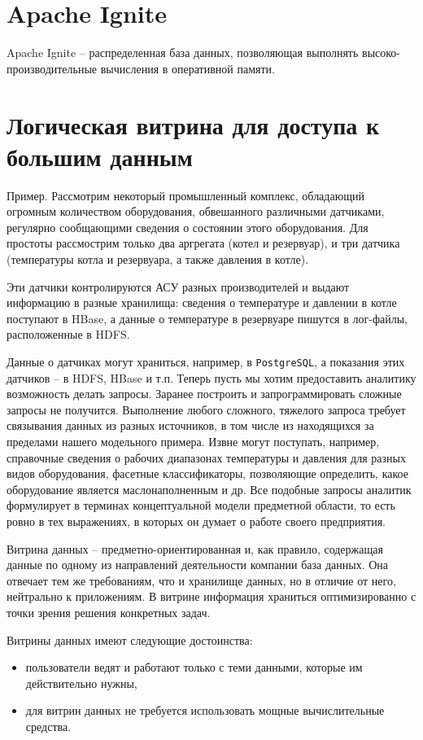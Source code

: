 \documentclass[%
	11pt,
	a4paper,
	utf8,
		]{article}
\begin{document}
\section{Apache Ignite}

Apache Ignite -- распределенная база данных, позволяющая выполнять высоко-производительные вычисления в оперативной памяти.


\section{Логическая витрина для доступа к большим данным}

Пример. Рассмотрим некоторый промышленный комплекс, обладающий огромным количеством оборудования, обвешанного различными датчиками, регулярно сообщающими сведения о состоянии этого оборудования. Для простоты рассмострим только два аргрегата (котел и резервуар), и три датчика (температуры котла и резервуара, а также давления в котле).

Эти датчики контролируются АСУ разных производителей и выдают информацию в разные хранилища: сведения о температуре и давлении в котле поступают в HBase, а данные о температуре в резервуаре пишутся в лог-файлы, расположенные в HDFS.

Данные о датчиках могут храниться, например, в \texttt{PostgreSQL}, а показания этих датчиков -- в HDFS, HBase и т.п. Теперь пусть мы хотим предоставить аналитику возможность делать запросы. Заранее построить и запрограммировать сложные запросы не получится. Выполнение любого сложного, тяжелого запроса требует связывания данных из разных источников, в том числе из находящихся за пределами нашего модельного примера. Извне могут поступать, например, справочные сведения о рабочих диапазонах температуры и давления для разных видов оборудования, фасетные классификаторы, позволяющие определить, какое оборудование является маслонаполненным и др. Все подобные запросы аналитик формулирует в терминах концептуальной модели предметной области, то есть ровно в тех выражениях, в которых он думает о работе своего предприятия.

Витрина данных -- предметно-ориентированная и, как правило, содержащая данные по одному из направлений деятельности компании база данных. Она отвечает тем же требованиям, что и хранилище данных, но в отличие от него, нейтрально к приложениям. В витрине информация храниться оптимизированно с точки зрения решения конкретных задач.

Витрины данных имеют следующие достоинства:
\begin{itemize}
	\item пользователи ведят и работают только с теми данными, которые им действительно нужны,
	
	\item для витрин данных не требуется использовать мощные вычислительные средства.
\end{itemize}
\end{document}
